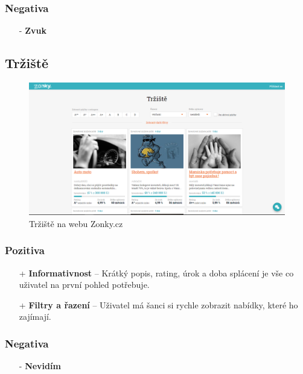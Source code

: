\subsubsection*{Negativa}
\begin{itemize}
    \item[-] \textbf{Zvuk}
\end{itemize}



\newpage
\subsection{Tržiště}
\begin{figure}[h]
    \centering
    \includegraphics[width=1.0\textwidth]{media/zonky/marketplace.png}
    \caption{Tržiště na webu Zonky.cz}
    \label{fig:zonky:marketplace}
\end{figure}
\subsubsection*{Pozitiva}
\begin{itemize}
    \item[+] \textbf{Informativnost} -- Krátký popis, rating, úrok a doba splácení je vše co uživatel na první pohled potřebuje.
    \item[+] \textbf{Filtry a řazení} -- Uživatel má šanci si rychle zobrazit nabídky, které ho zajímají.
\end{itemize}
\subsubsection*{Negativa}
\begin{itemize}
    \item[-] \textbf{Nevidím}
\end{itemize}


